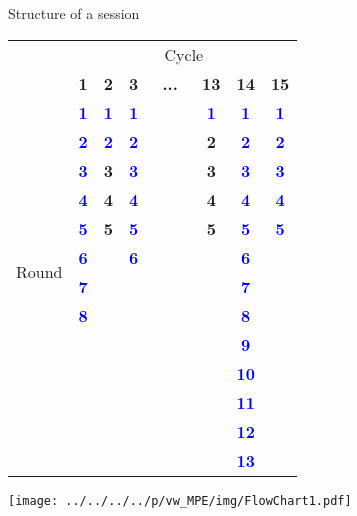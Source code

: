 \documentclass{beamer}
\begin{document}
\begin{frame}{Structure of a session}

\begin{center}
\begin{tabular}{c|c|c|c|ccc|c|c|c|}
\multicolumn{1}{c}{} & \multicolumn{9}{c}{Cycle}\tabularnewline
\multirow{14}{*}{\begin{turn}{90}
Round
\end{turn}} & \textbf{\tiny{}1} & \textbf{\tiny{}2} & \textbf{\tiny{}3} & \multicolumn{3}{c|}{\textbf{\tiny{}...}} & \textbf{\tiny{}13} & \textbf{\tiny{}14} & \textbf{\tiny{}15}\tabularnewline
\cline{2-10}
 & \textbf{\textcolor{blue}{\tiny{}1}} & \textbf{\textcolor{blue}{\tiny{}1}} & \textbf{\textcolor{blue}{\tiny{}1}} &  &  &  & \textbf{\textcolor{blue}{\tiny{}1}} & \textbf{\textcolor{blue}{\tiny{}1}} & \textbf{\textcolor{blue}{\tiny{}1}}\tabularnewline
 & \textbf{\textcolor{blue}{\tiny{}2}} & \textbf{\textcolor{blue}{\tiny{}2}} & \textbf{\textcolor{blue}{\tiny{}2}} &  &  &  & \textbf{\tiny{}2} & \textbf{\textcolor{blue}{\tiny{}2}} & \textbf{\textcolor{blue}{\tiny{}2}}\tabularnewline
 & \textbf{\textcolor{blue}{\tiny{}3}} & \textbf{\tiny{}3} & \textbf{\textcolor{blue}{\tiny{}3}} &  &  &  & \textbf{\tiny{}3} & \textbf{\textcolor{blue}{\tiny{}3}} & \textbf{\textcolor{blue}{\tiny{}3}}\tabularnewline
 & \textbf{\textcolor{blue}{\tiny{}4}} & \textbf{\tiny{}4} & \textbf{\textcolor{blue}{\tiny{}4}} &  &  &  & \textbf{\tiny{}4} & \textbf{\textcolor{blue}{\tiny{}4}} & \textbf{\textcolor{blue}{\tiny{}4}}\tabularnewline
 & \textbf{\textcolor{blue}{\tiny{}5}} & \textbf{\tiny{}5} & \textbf{\textcolor{blue}{\tiny{}5}} &  &  &  & \textbf{\tiny{}5} & \textbf{\textcolor{blue}{\tiny{}5}} & \textbf{\textcolor{blue}{\tiny{}5}}\tabularnewline
 & \textbf{\textcolor{blue}{\tiny{}6}} &  & \textbf{\textcolor{blue}{\tiny{}6}} &  &  &  &  & \textbf{\textcolor{blue}{\tiny{}6}} & \tabularnewline
 & \textbf{\textcolor{blue}{\tiny{}7}} &  &  &  &  &  &  & \textbf{\textcolor{blue}{\tiny{}7}} & \tabularnewline
 & \textbf{\textcolor{blue}{\tiny{}8}} &  &  &  &  &  &  & \textbf{\textcolor{blue}{\tiny{}8}} & \tabularnewline
 &  &  &  &  &  &  &  & \textbf{\textcolor{blue}{\tiny{}9}} & \tabularnewline
 &  &  &  &  &  &  &  & \textbf{\textcolor{blue}{\tiny{}10}} & \tabularnewline
 &  &  &  &  &  &  &  & \textbf{\textcolor{blue}{\tiny{}11}} & \tabularnewline
 &  &  &  &  &  &  &  & \textbf{\textcolor{blue}{\tiny{}12}} & \tabularnewline
 &  &  &  &  &  &  &  & \textbf{\textcolor{blue}{\tiny{}13}} & \tabularnewline
\end{tabular}
\par\end{center}

\end{frame}
\begin{frame}


\begin{center}
\texttt{[image: ../../../../p/vw\_MPE/img/FlowChart1.pdf]}
\end{center}
\end{frame}
\end{document}
